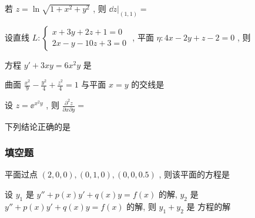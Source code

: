 \begin{ti}
	若 $z=\ln\sqrt{1+x^2+y^2}$ , 则 $\left.\dd{z}\right|_{(1,1)}=$\kuo
\end{ti}

\begin{ti}
	设直线 $L:\begin{cases}
	x+3y+2z+1=0\\
	2x-y-10z+3=0
	\end{cases}$ , 平面 $\eta:4x-2y+z-2=0$ , 则\kuo
\end{ti}

\begin{ti}
	方程 $y'+3xy=6x^2y$ 是\kuo
\end{ti}

\begin{ti}
	曲面 $\frac{x^2}{9}-\frac{y^2}{4}+\frac{z^2}{4}=1$ 与平面 $x=y$ 的交线是\kuo
\end{ti}

\begin{ti}
	设 $z=\ee^{x^2y}$ , 则 $\frac{\partial^2z}{\partial x\partial y}=$\kuo
\end{ti}

\begin{ti}
	下列结论正确的是\kuo
\end{ti}


\subsubsection{填空题}
\begin{ti}
	平面过点 $(2,0,0),(0,1,0),(0,0,0.5)$ , 则该平面的方程是 \hua{}
\end{ti}

\begin{ti}
	设 $y_1$ 是 $y''+p(x)y'+q(x)y=f(x)$ 的解, $y_2$ 是 $y''+p(x)y'+q(x)y=f(x)$ 的解, 则 $y_1+y_2$ 是 \hua{}方程的解
\end{ti}

